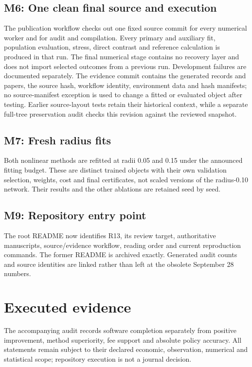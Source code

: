 \subsection*{M6: One clean final source and execution}
The publication workflow checks out one fixed source commit for every numerical worker and for audit and compilation. Every primary and auxiliary fit, population evaluation, stress, direct contrast and reference calculation is produced in that run. The final numerical stage contains no recovery layer and does not import selected outcomes from a previous run. Development failures are documented separately. The evidence commit contains the generated records and papers, the source hash, workflow identity, environment data and hash manifests; no source-manifest exception is used to change a fitted or evaluated object after testing. Earlier source-layout tests retain their historical context, while a separate full-tree preservation audit checks this revision against the reviewed snapshot.

\subsection*{M7: Fresh radius fits}
Both nonlinear methods are refitted at radii 0.05 and 0.15 under the announced fitting budget. These are distinct trained objects with their own validation selection, weights, cost and final certificates, not scaled versions of the radius-0.10 network. Their results and the other ablations are retained seed by seed.

\subsection*{M9: Repository entry point}
The root README now identifies R13, its review target, authoritative manuscripts, source/evidence workflow, reading order and current reproduction commands. The former README is archived exactly. Generated audit counts and source identities are linked rather than left at the obsolete September 28 numbers.

\section*{Executed evidence}

The accompanying audit records software completion separately from positive improvement, method superiority, fee support and absolute policy accuracy. All statements remain subject to their declared economic, observation, numerical and statistical scope; repository execution is not a journal decision.
